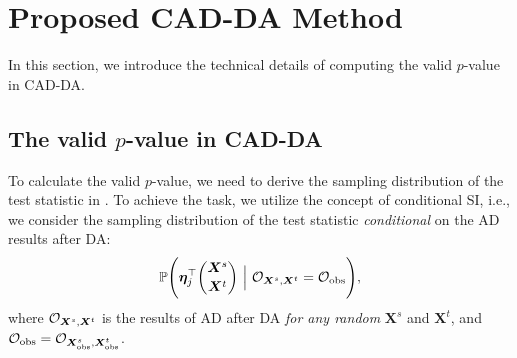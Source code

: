 \section{Proposed CAD-DA Method} \label{sec:method}


In this section, we introduce the technical details of computing the valid $p$-value in CAD-DA.

\subsection{The valid $p$-value in CAD-DA} \label{subsec:valid_p_value}

To calculate the valid $p$-value, we need to derive the sampling distribution of the test statistic in .
%
To achieve the task, we utilize the concept of conditional SI, i.e., we consider the sampling distribution of the test statistic  \emph{conditional} on the AD results after DA:
%
\begin{align} \label{eq:conditional_distribution}
	\mathbb{P} \Bigg ( 
	\bm \eta_j^\top {\bm X^s \choose \bm X^t }
	~
	\Big |
	~ 
	{\mathcal O}_{\bm X^s, \bm X^t}
	=
	{\mathcal O}_{\rm obs}
	\Bigg ),
\end{align}
%
where ${\mathcal O}_{\bm X^s, \bm X^t}$ is the results of AD after DA \emph{for any random} $\bm X^s$ and $\bm X^t$, and ${\mathcal O}_{\rm obs} = {\mathcal O}_{\bm X^s_{\rm obs}, \bm X^t_{\rm obs}}$.

